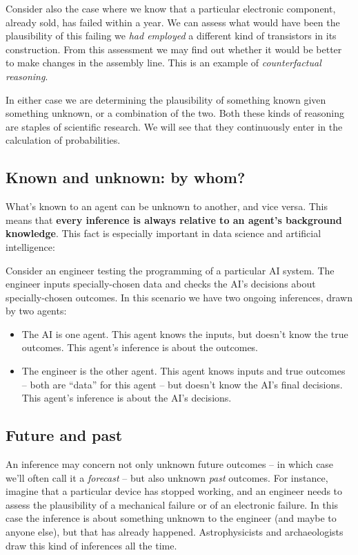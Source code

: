 \documentclass[
  a4paper,
  DIV=11,
  numbers=noendperiod,
  oneside]{scrreprt}
\begin{document}
Consider also the case where we know that a particular electronic
component, already sold, has failed within a year. We can assess what
would have been the plausibility of this failing we \emph{had employed}
a different kind of transistors in its construction. From this
assessment we may find out whether it would be better to make changes in
the assembly line. This is an example of \emph{counterfactual
reasoning}.

In either case we are determining the plausibility of something known
given something unknown, or a combination of the two. Both these kinds
of reasoning are staples of scientific research. We will see that they
continuously enter in the calculation of probabilities.

\hypertarget{known-and-unknown-by-whom}{%
\subsection{Known and unknown: by
whom?}\label{known-and-unknown-by-whom}}

What's known to an agent can be unknown to another, and vice versa. This
means that {\textbf{every inference is always relative to an agent's
background knowledge}}. This fact is especially important in data
science and artificial intelligence:

Consider an engineer testing the programming of a particular AI system.
The engineer inputs specially-chosen data and checks the AI's decisions
about specially-chosen outcomes. In this scenario we have two ongoing
inferences, drawn by two agents:

\begin{itemize}
\item
  The AI is one agent. This agent knows the inputs, but doesn't know the
  true outcomes. This agent's inference is about the outcomes.
\item
  The engineer is the other agent. This agent knows inputs and true
  outcomes -- both are ``data'' for this agent -- but doesn't know the
  AI's final decisions. This agent's inference is about the AI's
  decisions.
\end{itemize}

\hypertarget{future-and-past}{%
\subsection{Future and past}\label{future-and-past}}

An inference may concern not only unknown future outcomes -- in which
case we'll often call it a \emph{forecast} -- but also unknown
\emph{past} outcomes. For instance, imagine that a particular device has
stopped working, and an engineer needs to assess the plausibility of a
mechanical failure or of an electronic failure. In this case the
inference is about something unknown to the engineer (and maybe to
anyone else), but that has already happened. Astrophysicists and
archaeologists draw this kind of inferences all the time.
\end{document}
